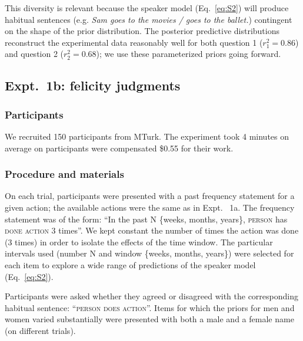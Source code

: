 \documentclass[10pt,letterpaper]{article}
\begin{document}
This diversity is relevant because the speaker model (Eq.~\ref{eq:S2}) will produce habitual sentences (e.g. \emph{Sam goes to the movies / goes to the ballet.}) contingent on the shape of the prior distribution. 
The posterior predictive distributions reconstruct the experimental data reasonably well for both question 1 ($r^2_{1} = 0.86$) and question 2 ($r^2_{2} = 0.68$); we use these parameterized priors going forward.


\subsection{Expt.~1b: felicity judgments}
\subsubsection{Participants}

We recruited 150 participants from MTurk.
The experiment took 4 minutes on average on participants were compensated \$0.55 for their work.

\subsubsection{Procedure and materials}

On each trial, participants were presented with a past frequency statement for a given action; the available actions were the same as in Expt. ~1a. 
The frequency statement was of the form: ``In the past N \{weeks, months, years\}, \textsc{person} has \textsc{done action} 3 times''.
We kept constant the number of times the action was done (3 times) in order to isolate the effects of the time window. 
The particular intervals used (number N and window \{weeks, months, years\}) were selected for each item to explore a wide range of predictions of the speaker model (Eq.~\ref{eq:S2}).

Participants were asked whether they agreed or disagreed with the corresponding habitual sentence: ``\textsc{person does action}''.
Items for which the priors for men and women varied substantially were presented with both a male and a female name (on different trials). 

\end{document}
